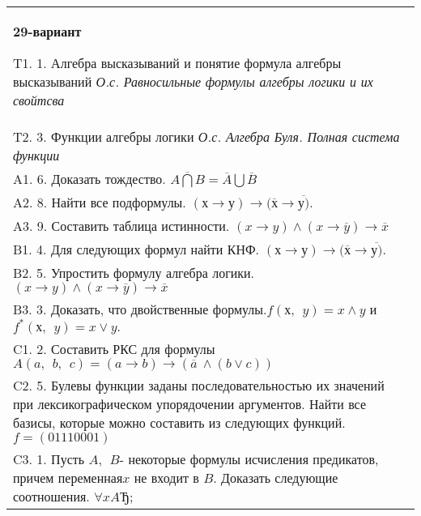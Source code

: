 \documentclass{article}
\begin{document}
\begin{tabular}{m{17cm}}
\textbf{29-вариант}
\newline

T1. 1. Алгебра высказываний и понятие формула алгебры высказываний \emph{О.с. Равносильные формулы алгебры логики и их свойтсва} \\
T2. 3. Функции алгебры логики \emph{О.с. Алгебра Буля. Полная система функции} \\
A1. 6. Доказать тождество. \(\overline{A\bigcap B} = \overline{A}\bigcup\overline{B}\) \\
A2. 8. Найти все подформулы. \((х \rightarrow у) \rightarrow (\overline{х} \rightarrow \overline{у)}\). \\
A3. 9. Составить таблица истинности. \((x \rightarrow y) \land (x \rightarrow \overline{y}) \rightarrow \overline{x}\) \\
B1. 4. Для следующих формул найти КНФ. \((х \rightarrow у) \rightarrow (\overline{х} \rightarrow \overline{у)}\). \\
B2. 5. Упростить формулу алгебра логики. \((x \rightarrow y) \land (x \rightarrow \overline{y}) \rightarrow \overline{x}\) \\
B3. 3. Доказать, что двойственные формулы.\(f(х,\ \ y) = x \land y\) и \(f^{*}(х,\ \ y) = x \vee y.\) \\
C1. 2. Составить РКС для формулы \(A(a,\ \ b,\ \ c) = (a \rightarrow b) \rightarrow (\overline{a}\  \land (b \vee c))\) \\
C2. 5. Булевы функции заданы последовательностью их значений при лексикографическом упорядочении аргументов. Найти все базисы, которые можно составить из следующих функций. \(f = (01110001)\) \\
C3. 1. Пусть \(A,\ \ B\)- некоторые формулы исчисления предикатов, причем переменная\(x\) не входит в \(B\). Доказать следующие соотношения. \(\forall xAЂ\); \\

\end{tabular}
\vspace{1cm}
\end{document}
